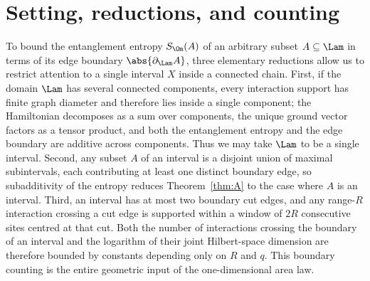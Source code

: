 
\section{Setting, reductions, and counting}\label{sec:setting}

\begin{inwords}
To bound the entanglement entropy $S_\Om(A)$ of an arbitrary subset
$A\subseteq\Lam$ in terms of its edge boundary $\abs{\partial_\Lam A}$,
three elementary reductions allow us to restrict attention to a single
interval $X$ inside a connected chain. First, if the domain $\Lam$ has
several connected components, every interaction support has finite graph
diameter and therefore lies inside a single component; the Hamiltonian
decomposes as a sum over components, the unique ground vector factors as a
tensor product, and both the entanglement entropy and the edge boundary
are additive across components. Thus we may take $\Lam$ to be a single
interval. Second, any subset $A$ of an interval is a disjoint union of
maximal subintervals, each contributing at least one distinct boundary
edge, so subadditivity of the entropy reduces Theorem~\ref{thm:A} to the
case where $A$ is an interval. Third, an interval has at most two boundary
cut edges, and any range-$R$ interaction crossing a cut edge is supported
within a window of $2R$ consecutive sites centred at that cut. Both the
number of interactions crossing the boundary of an interval and the
logarithm of their joint Hilbert-space dimension are therefore bounded by
constants depending only on $R$ and $q$. This boundary counting is the
entire geometric input of the one-dimensional area law.
\end{inwords}

